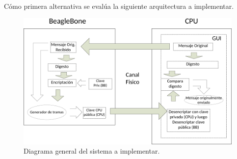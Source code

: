 \documentclass[oneside,11pt,a4paper,spanish]{article}
\begin{document}
Cómo primera alternativa se evalúa la siguiente arquitectura a implementar.

\begin{figure}[h]
  \centering
  \includegraphics[width=\textwidth]{images/arch}
  \caption{Diagrama general del sistema a implementar.}
\end{figure}
\end{document}
